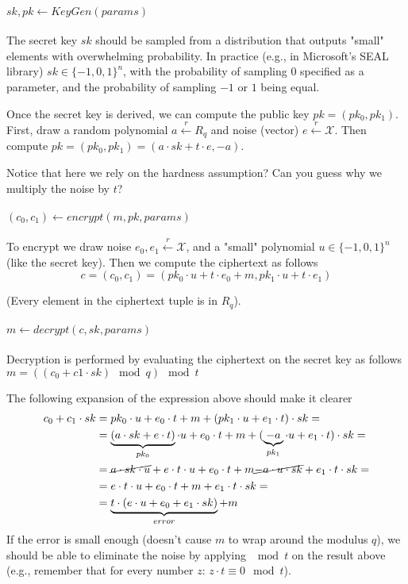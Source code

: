 \paragraph{$sk,pk \leftarrow KeyGen(params)$}
The secret key $sk$ should be sampled from a distribution that outputs "small" elements 
with overwhelming probability. In practice (e.g., in Microsoft's SEAL library) $sk\in\{-1,0,1\}^n$,
with the probability of sampling 0 specified as a parameter, and the probability of sampling $-1$ or $1$
being equal. 

Once the secret key is derived, we can compute the public key $pk=(pk_0,pk_1)$.
First, draw a random polynomial $a\overset{r}{\leftarrow} R_q$ and 
noise (vector) $e\overset{r}{\leftarrow} \mathcal{X}$. Then compute 
$pk=(pk_0,pk_1)=(a\cdot sk+t\cdot e, -a)$.

Notice that here we rely on the hardness assumption? 
Can you guess why we multiply the noise by $t$?

\paragraph{$(c_0,c_1) \leftarrow encrypt(m,pk, params)$}
To encrypt we draw noise $e_0,e_1 \overset{r}{\leftarrow} \mathcal{X}$, and a "small" polynomial 
$u\in \{-1,0,1\}^n$ (like the secret key).
Then we compute the ciphertext as follows $$c=(c_0,c_1)= (pk_0\cdot u +t\cdot e_0+m, pk_1\cdot u +t\cdot e_1)$$

(Every element in the ciphertext tuple is in $R_q$).


\paragraph{$m \leftarrow decrypt(c,sk,params)$}

Decryption is performed by evaluating the ciphertext on the secret
key as follows $ m=((c_0+c1\cdot sk) \mod q) \mod t$

The following expansion of the expression above should make it clearer
\begin{align*}
c_{0}+c_{1}\cdot sk & =pk_{0}\cdot u+e_{0}\cdot t+m+(pk_{1}\cdot u+e_{1}\cdot t)\cdot sk=\\
 & =\underbrace{(a\cdot sk +e\cdot t)}_{pk_0} \cdot u + e_{0}\cdot t + m + (\underbrace{-a}_{pk_1}\cdot u+e_{1}\cdot t)\cdot sk=\\
 & = \cancel{a\cdot sk\cdot u} +e\cdot t\cdot u +e_{0}\cdot t + m  \cancel{-a\cdot u\cdot sk} +e_{1}\cdot t\cdot sk = \\
 & = e\cdot t\cdot u +e_{0}\cdot t + m  +e_{1}\cdot t\cdot sk = \\
 & = \underbrace{t\cdot (e\cdot u + e_0 +e_1\cdot sk)}_{error} + m
\end{align*}
If the error is small enough (doesn't cause $m$ to wrap around the modulus $q$), we should be able to eliminate the noise 
by applying $\mod t$ on the result above (e.g., remember that for every number $z$: $z\cdot t \equiv 0 \mod t$).

